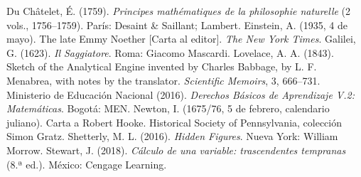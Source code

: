 \documentclass[11pt]{article}
\begin{document}
\begin{referencias}
 Du Châtelet, É. (1759). \emph{Principes mathématiques
  de la philosophie naturelle} (2 vols., 1756--1759). París: Desaint \& Saillant; Lambert.
 Einstein, A. (1935, 4 de mayo). The late Emmy
  Noether [Carta al editor]. \emph{The New York Times}.
 Galilei, G. (1623). \emph{Il Saggiatore}. Roma:
  Giacomo Mascardi.
 Lovelace, A. A. (1843). Sketch of the Analytical Engine
  invented by Charles Babbage, by L. F. Menabrea, with notes by the translator.
  \emph{Scientific Memoirs}, 3, 666--731.
 Ministerio de Educación Nacional (2016). \emph{Derechos
  Básicos de Aprendizaje V.2: Matemáticas}. Bogotá: MEN.
 Newton, I. (1675/76, 5 de febrero, calendario juliano). Carta a
  Robert Hooke. Historical Society of Pennsylvania, colección Simon Gratz.
 Shetterly, M. L. (2016). \emph{Hidden Figures}.
  Nueva York: William Morrow.
 Stewart, J. (2018). \emph{Cálculo de una variable:
  trascendentes tempranas} (8.ª ed.). México: Cengage Learning.
\end{referencias}
\end{document}
